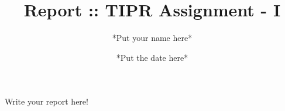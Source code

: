 \documentclass{article}
\title{Report :: TIPR Assignment - I}
\author{*Put your name here*}
\date{*Put the date here*}
\begin{document}
\maketitle

Write your report here!
\end{document}

